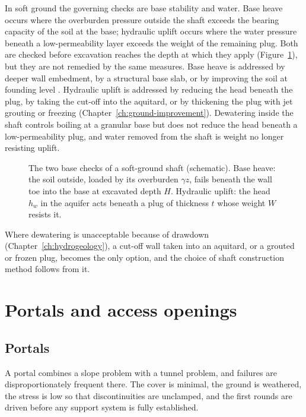 In soft ground the governing checks are base stability and water. Base heave
occurs where the overburden pressure outside the shaft exceeds the bearing
capacity of the soil at the base; hydraulic uplift occurs where the water
pressure beneath a low-permeability layer exceeds the weight of the remaining
plug. Both are checked before excavation reaches the depth at which they
apply (Figure~\ref{fig:shaft-base-stability}), but they are not remedied by the same measures. Base heave is addressed
by deeper wall embedment, by a structural base slab, or by improving the soil
at founding level \citep{broms1967stability,davis1980stability}. Hydraulic
uplift is addressed by reducing the head beneath the plug, by taking the
cut-off into the aquitard, or by thickening the plug with jet grouting or
freezing (Chapter~\ref{ch:ground-improvement}). Dewatering inside the shaft
controls boiling at a granular base but does not reduce the head beneath a
low-permeability plug, and water removed from the shaft is weight no longer
resisting uplift.

\begin{figure}[htbp]
\centering
{}
\caption{The two base checks of a soft-ground shaft (schematic). Base heave: the soil outside, loaded by its overburden $\gamma z$, fails beneath the wall toe into the base at excavated depth $H$. Hydraulic uplift: the head $h_w$ in the aquifer acts beneath a plug of thickness $t$ whose weight $W$ resists it.}
\label{fig:shaft-base-stability}
\end{figure}

Where dewatering is unacceptable because of drawdown
(Chapter~\ref{ch:hydrogeology}), a cut-off wall taken into an aquitard, or a
grouted or frozen plug, becomes the only option, and the choice of shaft
construction method follows from it.

\section{Portals and access openings}
\label{sec:portals-openings}

\subsection{Portals}
\label{sec:portals}

A portal combines a slope problem with a tunnel problem, and failures
are disproportionately frequent there. The
cover is minimal, the ground is weathered, the stress is low so that
discontinuities are unclamped, and the first rounds are driven before any
support system is fully established.

